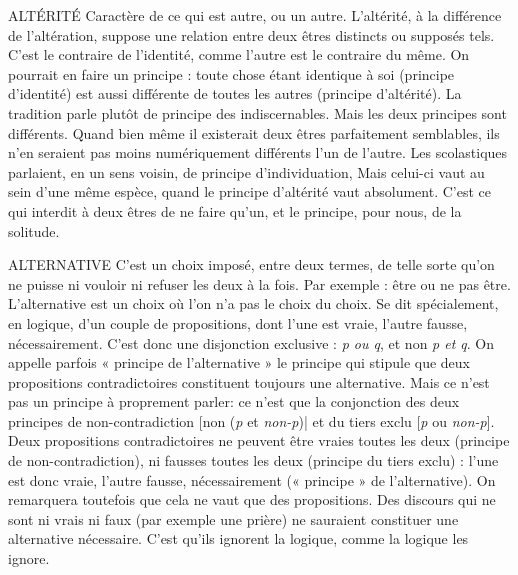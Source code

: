 ALTÉRITÉ Caractère de ce qui est autre, ou un autre. L’altérité, à la différence
de l’altération, suppose une relation entre deux êtres distincts
ou supposés tels. C’est le contraire de l'identité, comme l’autre est le
contraire du même. On pourrait en faire un principe : toute chose étant identique
à soi (principe d'identité) est aussi différente de toutes les autres (principe
d’altérité). La tradition parle plutôt de principe des indiscernables. Mais les
deux principes sont différents. Quand bien même il existerait deux êtres parfaitement
semblables, ils n’en seraient pas moins numériquement différents l’un
de l’autre. Les scolastiques parlaient, en un sens voisin, de principe d’individuation,
Mais celui-ci vaut au sein d’une même espèce, quand le principe d’altérité
vaut absolument. C’est ce qui interdit à deux êtres de ne faire qu’un, et le principe,
pour nous, de la solitude.

ALTERNATIVE C'est un choix imposé, entre deux termes, de telle sorte qu’on
ne puisse ni vouloir ni refuser les deux à la fois. Par exemple :
être ou ne pas être. L’alternative est un choix où l’on n’a pas le choix du choix.
Se dit spécialement, en logique, d’un couple de propositions, dont l’une est
vraie, l’autre fausse, nécessairement. C’est donc une disjonction exclusive : {\it p ou
q}, et non {\it p et q}. On appelle parfois « principe de l'alternative » le principe qui
stipule que deux propositions contradictoires constituent toujours une alternative.
Mais ce n’est pas un principe à proprement parler: ce n'est que la
conjonction des deux principes de non-contradiction [non ({\it p} et {\it non-p})| et du
tiers exclu [{\it p} ou {\it non-p}]. Deux propositions contradictoires ne peuvent être
vraies toutes les deux (principe de non-contradiction), ni fausses toutes les deux
(principe du tiers exclu) : l’une est donc vraie, l’autre fausse, nécessairement
(« principe » de l'alternative). On remarquera toutefois que cela ne vaut que des
propositions. Des discours qui ne sont ni vrais ni faux (par exemple une prière)
ne sauraient constituer une alternative nécessaire. C’est qu’ils ignorent la
logique, comme la logique les ignore.

